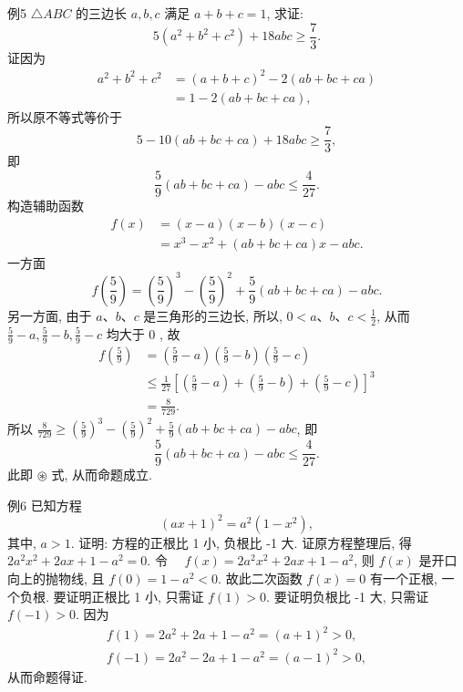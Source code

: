 例5 $\triangle A B C$ 的三边长 $a, b, c$ 满足 $a+b+c=1$, 求证:
$$
5\left(a^2+b^2+c^2\right)+18 a b c \geqslant \frac{7}{3} .
$$
证因为
$$
\begin{aligned}
a^2+b^2+c^2 & =(a+b+c)^2-2(a b+b c+c a) \\
& =1-2(a b+b c+c a),
\end{aligned}
$$
所以原不等式等价于
$$
5-10(a b+b c+c a)+18 a b c \geqslant \frac{7}{3},
$$
即
$$
\frac{5}{9}(a b+b c+c a)-a b c \leqslant \frac{4}{27} .
$$
构造辅助函数
$$
\begin{aligned}
f(x) & =(x-a)(x-b)(x-c) \\
& =x^3-x^2+(a b+b c+c a) x-a b c .
\end{aligned}
$$
一方面
$$
f\left(\frac{5}{9}\right)=\left(\frac{5}{9}\right)^3-\left(\frac{5}{9}\right)^2+\frac{5}{9}(a b+b c+c a)-a b c .
$$
另一方面, 由于 $a 、 b 、 c$ 是三角形的三边长, 所以, $0<a 、 b 、 c<\frac{1}{2}$, 从而 $\frac{5}{9}-a, \frac{5}{9}-b, \frac{5}{9}-c$ 均大于 0 , 故
$$
\begin{aligned}
f\left(\frac{5}{9}\right) & =\left(\frac{5}{9}-a\right)\left(\frac{5}{9}-b\right)\left(\frac{5}{9}-c\right) \\
& \leqslant \frac{1}{27}\left[\left(\frac{5}{9}-a\right)+\left(\frac{5}{9}-b\right)+\left(\frac{5}{9}-c\right)\right]^3 \\
& =\frac{8}{729} .
\end{aligned}
$$
所以 $\frac{8}{729} \geqslant\left(\frac{5}{9}\right)^3-\left(\frac{5}{9}\right)^2+\frac{5}{9}(a b+b c+c a)-a b c$, 即
$$
\frac{5}{9}(a b+b c+c a)-a b c \leqslant \frac{4}{27} .
$$
此即 $\circledast$ 式, 从而命题成立.



例6 已知方程
$$
(a x+1)^2=a^2\left(1-x^2\right),
$$
其中, $a>1$. 证明: 方程的正根比 1 小, 负根比 -1 大.
证原方程整理后, 得 $2 a^2 x^2+2 a x+1-a^2=0$.
令 $\quad f(x)=2 a^2 x^2+2 a x+1-a^2$,
则 $f(x)$ 是开口向上的抛物线, 且 $f(0)=1-a^2<0$. 故此二次函数 $f(x)=0$ 有一个正根, 一个负根.
要证明正根比 1 小, 只需证 $f(1)>0$. 要证明负根比 -1 大, 只需证 $f(-1)>0$. 因为
$$
\begin{gathered}
f(1)=2 a^2+2 a+1-a^2=(a+1)^2>0, \\
f(-1)=2 a^2-2 a+1-a^2=(a-1)^2>0,
\end{gathered}
$$
从而命题得证.



